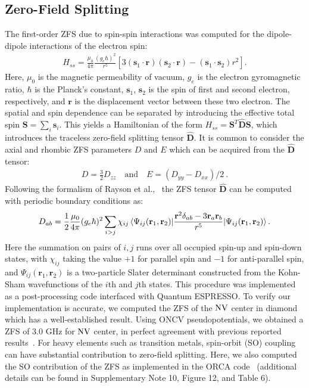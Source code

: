 \subsection{Zero-Field Splitting}
The first-order ZFS due to spin-spin interactions was computed for the dipole-dipole interactions of the electron spin:
\begin{align}
    H_{ss} = \frac{\mu_0}{4\pi} \frac{(g_e\hbar)^2}{r^5} \left[
        3(\textbf{s}_1 \cdot \textbf{r})(\textbf{s}_2 \cdot \textbf{r})
        -(\textbf{s}_1 \cdot \textbf{s}_2)r^2
    \right].
\end{align}
Here, $\mu_0$ is the magnetic permeability of vacuum, $g_e$ is the electron gyromagnetic ratio, $\hbar$ is the Planck's constant, $\textbf{s}_1$, $\textbf{s}_2$ is the spin of first and second electron, respectively, and $\textbf{r}$ is the displacement vector between these two electron.
The spatial and spin dependence can be separated by introducing the effective total spin $\textbf{S}=\sum_i \textbf{s}_i$. This yields a Hamiltonian of the form $H_{ss} =  \textbf{S}^T\hat{\textbf{D}}\textbf{S}$, which introduces the traceless zero-field splitting tensor $\hat{\textbf{D}}$. It is common to consider the axial and rhombic ZFS parameters $D$ and $E$ which can be acquired from the $\hat{\textbf{D}}$ tensor:
\begin{align}
    D = \frac{3}{2} D_{zz} \quad \text{and} \quad E = (D_{yy} - D_{xx})/ 2\ .
\end{align}
Following the formalism of Rayson et al.,~\cite{rayson2008first} the ZFS tensor $\hat{\textbf{D}}$ can be computed with periodic boundary conditions as:
\begin{align}
    D_{ab} = \frac{1}{2}\frac{\mu_0}{4\pi} (g_e\hbar)^2 \sum_{i>j} \chi_{ij}
        \expval{
            \frac{\textbf{r}^2\delta_{ab}-3\textbf{r}_a\textbf{r}_b}{r^5}
        }{
            \Psi_{ij}(\textbf{r}_1, \textbf{r}_2)
        }.
\end{align}
Here the summation on pairs of $i,j$ runs over all occupied spin-up and spin-down states, with $\chi_{ij}$ taking the value $+1$ for parallel spin and $-1$ for anti-parallel spin, and $\Psi_{ij}(\textbf{r}_1,\textbf{r}_2)$ is a two-particle Slater determinant constructed from the Kohn-Sham wavefunctions of the $i$th and $j$th states. This procedure was implemented as a post-processing code interfaced with Quantum ESPRESSO.
To verify our implementation is accurate, we computed the ZFS of the $\text{NV}$ center in diamond which has a well-established result. Using ONCV pseudopotentials, we obtained a ZFS of 3.0 GHz for $\text{NV}$ center, in perfect agreement with previous reported results~\cite{seo2017designing}.
For heavy elements such as transition metals, spin-orbit (SO) coupling can have substantial contribution to zero-field splitting. Here, we also computed the SO contribution of the ZFS as implemented in the ORCA code~\cite{neese2012orca,neese2007calculation} (additional details can be found in Supplementary Note 10, Figure 12, and Table 6).

